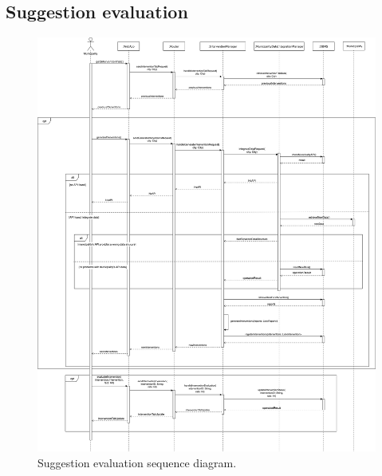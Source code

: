 \subsection{Suggestion evaluation}
\begin{figure}[H]
	\centering
	\includegraphics[width=\linewidth]{Images/SequenceDiagramSuggestionEvaluation}
	\caption{Suggestion evaluation sequence diagram.}
\end{figure}
